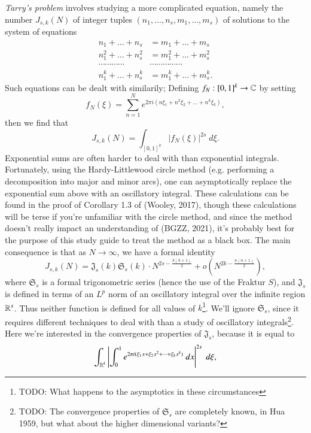 \emph{Tarry's problem} involves studying a more complicated equation, namely the number $J_{s,k}(N)$ of integer tuples $(n_1,\dots,n_s,m_1,\dots,m_s)$ of solutions to the system of equations
%
\begin{align*}
	n_1 + \dots + n_s &= m_1 + \dots + m_s\\
	n_1^2 + \dots + n_s^2 &= m_1^2 + \dots + m_s^2\\
	\cdots \cdots \cdots \cdots & \cdots \cdots \cdots \cdots \cdots\\
	n_1^k + \dots + n_s^k &= m_1^k + \dots + m_s^k.
\end{align*}
%
Such equations can be dealt with similarily; Defining $f_N: [0,1]^k \to \operatorname{\mathbb{C}}$ by setting
%
\[ f_N(\xi) = \sum_{n = 1}^N e^{2 \pi i (n\xi_1 + n^2 \xi_2 + \dots + n^k \xi_k)}, \]
%
then we find that
%
\begin{equation} \label{discretJskEquation}
	J_{s,k}(N) = \int_{[0,1]^k} |f_N(\xi)|^{2s}\; d\xi.
\end{equation}
%
Exponential sums are often harder to deal with than exponential integrals. Fortunately, using the Hardy-Littlewood circle method (e.g. performing a decomposition into major and minor arcs), one can asymptotically replace the exponential sum above with an oscillatory integral. These calculations can be found in the proof of Corollary 1.3 of (Wooley, 2017), though these calculations will be terse if you're unfamiliar with the circle method, and since the method doesn't really impact an understanding of (BGZZ, 2021), it's probably best for the purpose of this study guide to treat the method as a black box. The main consequence is that as $N \to \infty$, we have a formal identity
%
\[ J_{s,k}(N) = \mathfrak{J}_s(k) \mathfrak{S}_s(k) \cdot N^{2s - \frac{k(k+1)}{2}} + o \left( N^{2k - \frac{n(n+1)}{2}} \right), \]
%
where $\mathfrak{S}_s$ is a formal trigonometric series (hence the use of the Fraktur $S$), and $\mathfrak{J}_s$ is defined in terms of an $L^p$ norm of an oscillatory integral over the infinite region $\operatorname{\mathbb{R}}^s$. Thus neither function is defined for all values of $k$\footnote{TODO: What happens to the asymptotics in these circumstances}. We'll ignore $\mathfrak{S}_s$, since it requires different techniques to deal with than a study of oscillatory integrals\footnote{TODO: The convergence properties of $\mathfrak{S}_s$ are completely known, in Hua 1959, but what about the higher dimensional variants?}. Here we're interested in the convergence properties of $\mathfrak{J}_s$, because it is equal to
%
\begin{equation} \label{JsSingularEquation}
	\int_{\operatorname{\mathbb{R}}^k} \left| \int_0^1 e^{2 \pi i (\xi_1 x + \xi_2 x^2 + \dots + \xi_k x^k)}\; dx \right|^{2s}\; d\xi,
\end{equation}
